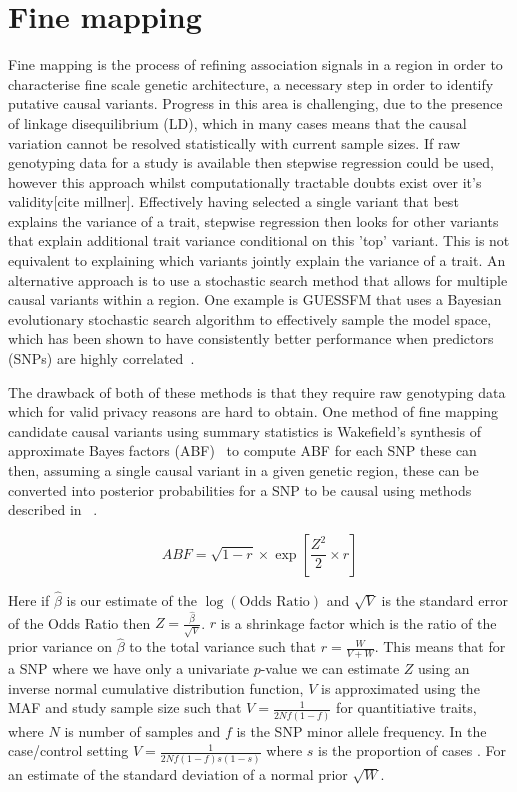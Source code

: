 \documentclass[a4paper,11pt]{report}
\begin{document}
\section{Fine mapping}

Fine mapping is the process of refining association signals in a region in order to characterise fine scale genetic architecture, a necessary step in order to identify putative causal variants. Progress in this area is challenging, due to the presence of linkage disequilibrium (LD), which in many cases means that the causal variation cannot be resolved statistically with current sample sizes.  If raw genotyping data for a study is available then stepwise regression could be used, however this approach whilst computationally tractable doubts exist over it's validity[cite millner]. Effectively having selected a single variant that best explains the variance of a trait, stepwise regression then looks for other variants that explain additional trait variance conditional on this 'top' variant. This is not equivalent to explaining which variants jointly explain the variance of a trait. An alternative approach is to use a stochastic search method that allows for multiple causal variants within a region. One example is GUESSFM that uses a Bayesian evolutionary stochastic search algorithm to effectively sample the model space, which has been shown to have consistently better performance when predictors (SNPs) are highly correlated~\cite{WallaceCutlerPontikosEtAl2015}. 

The drawback of both of these methods is that they require raw genotyping data  which for valid privacy reasons are hard to obtain. One method of fine mapping candidate causal variants  using summary statistics is Wakefield’s synthesis of approximate Bayes factors (ABF)~\citep{Wakefield2009} to compute ABF for each SNP these can then, assuming a single causal variant in a given genetic region, these can be converted into posterior probabilities for a SNP to be causal using methods described in ~\citet{The_Wellcome_Trust_Case_Control_Consortium2012-ad}. 

\begin{equation}
	ABF =  \sqrt{1 - r} \times \exp{\left[\frac{Z^{2}}{2} \times r\right]}
\end{equation}

Here if $\hat{\beta}$ is our estimate of the $\log(\text{Odds Ratio})$ and $\sqrt{V}$ is the standard error of the Odds Ratio then  $Z= \frac{\hat{\beta}}{\sqrt{V}}$. $r$ is a shrinkage factor which is the ratio of the prior variance on $\hat{\beta}$ to the total variance such that $r = \frac{W}{V + W}$. This means that for a SNP where we have only a univariate $p$-value we can estimate $Z$ using an inverse normal cumulative distribution function, $V$ is approximated using the MAF and study sample size such that $V=\frac{1}{2Nf(1-f)}$ for quantitiative traits, where $N$ is number of samples and $f$ is the SNP minor allele frequency. In the case/control setting $V=\frac{1}{2Nf(1-f)s(1-s)}$ where $s$ is the proportion of cases . For an estimate of the standard deviation of a normal prior $\sqrt{W}$.
\end{document}
